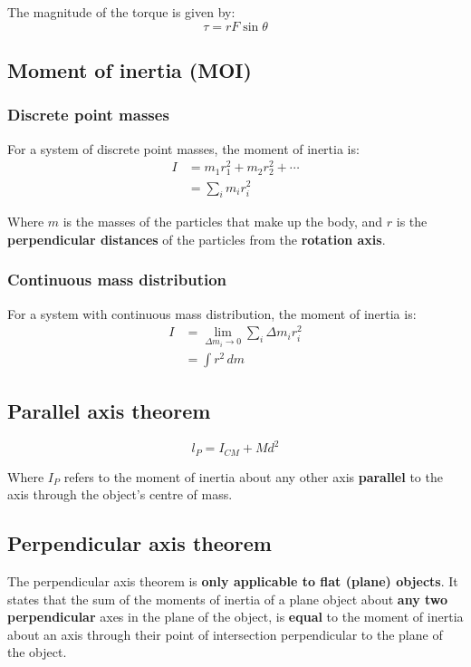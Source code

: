 \documentclass[11pt]{article}
\begin{document}
The magnitude of the torque is given by:
\[\tau = rF \sin \theta\]

\subsection{Moment of inertia (MOI)}
\label{sec:org29bc336}

\subsubsection{Discrete point masses}
\label{sec:org8ba25a9}
For a system of discrete point masses, the moment of inertia is:
\begin{align*}
I &= m_1 r_1^2 + m_2 r_2^2 + \cdots \\
&= \sum_{i} m_i r_i^2
\end{align*}

Where \(m\) is the masses of the particles that make up the body, and \(r\) is the \textbf{perpendicular distances} of the particles from the \textbf{rotation axis}.

\subsubsection{Continuous mass distribution}
\label{sec:orgda252fc}
For a system with continuous mass distribution, the moment of inertia is:
\begin{align*}
I &= \lim_{\Delta m_i \rightarrow 0} \sum_{i} \Delta m_i r_i^2 \\
&= \int r^2 \, dm
\end{align*}

\subsection{Parallel axis theorem}
\label{sec:orgae2c58a}
\[l_P = I_{CM} + Md^2\]

Where \(I_P\) refers to the moment of inertia about any other axis \textbf{parallel} to the axis through the object's centre of mass.

\subsection{Perpendicular axis theorem}
\label{sec:org71e7307}
The perpendicular axis theorem is \textbf{only applicable to flat (plane) objects}. It states that the sum of the moments of inertia of a plane object about \textbf{any two perpendicular} axes in the plane of the object, is \textbf{equal} to the moment of inertia about an axis through their point of intersection perpendicular to the plane of the object.
\\[0pt]
\end{document}
